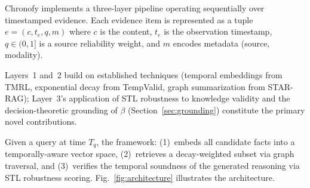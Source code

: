 \documentclass[conference]{IEEEtran}
\begin{document}
Chronofy implements a three-layer pipeline operating sequentially over timestamped evidence. Each evidence item is represented as a tuple $e = (c, t_e, q, m)$ where $c$ is the content, $t_e$ is the observation timestamp, $q \in (0, 1]$ is a source reliability weight, and $m$ encodes metadata (source, modality).

Layers~1 and~2 build on established techniques (temporal embeddings from TMRL, exponential decay from TempValid, graph summarization from STAR-RAG); Layer~3's application of STL robustness to knowledge validity and the decision-theoretic grounding of $\beta$ (Section~\ref{sec:grounding}) constitute the primary novel contributions.

Given a query at time $T_q$, the framework: (1)~embeds all candidate facts into a temporally-aware vector space, (2)~retrieves a decay-weighted subset via graph traversal, and (3)~verifies the temporal soundness of the generated reasoning via STL robustness scoring. Fig.~\ref{fig:architecture} illustrates the architecture.
\end{document}
